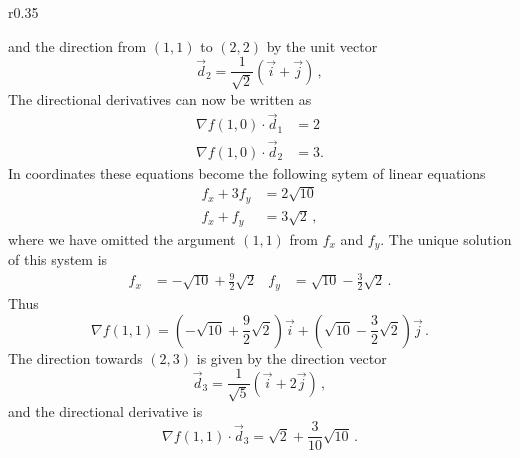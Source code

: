 \begin{solution}
\begin{wrapfigure}{r}{0.35\textwidth}
\end{wrapfigure}
and the direction from $(1,1)$ to $(2,2)$ by the unit vector
\[
\vec{d}_2 = \frac 1{\sqrt{2}} \left(\vec i + \vec j\right)\,,
\]
The directional derivatives can now be written as
\begin{align*}
\nabla f(1,0) \cdot \vec d_1 &= 2 \\
\nabla f(1,0) \cdot \vec d_2 &= 3.
\end{align*}
In coordinates these equations become the following sytem of linear equations
\begin{align*}
f_x + 3f_y &= 2\sqrt{10} \\
f_x + f_y &= 3\sqrt{2}\,,
\end{align*}
where we have omitted the argument $(1,1)$ from $f_x$ and $f_y$. The unique solution of this system is
\begin{align*}
f_x &= -\sqrt{10} + \frac 92 \sqrt{2} &
f_y &= \sqrt{10} - \frac 32 \sqrt{2}\,.
\end{align*}
Thus 
\[
\nabla f(1,1) = \left(-\sqrt{10} + \frac 92 \sqrt{2}\right) \vec i + 
\left(\sqrt{10} - \frac 32 \sqrt{2}\right) \vec j\,.
\]
The direction towards $(2,3)$ is given by the direction vector
\[
\vec{d}_3 = \frac 1{\sqrt{5}} \left( \vec i + 2 \vec j\right)\,,
\]
and the directional derivative is
\[
\nabla f(1,1) \cdot \vec{d}_3 = \sqrt{2} + \frac 3{10} \sqrt{10}\,.
\]
\end{solution}




